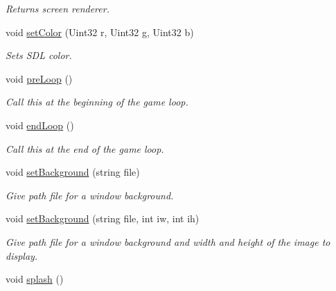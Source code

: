 \begin{DoxyCompactItemize}
\begin{DoxyCompactList}\small\item\em Returns screen renderer. \end{DoxyCompactList}\item 
void \hyperlink{classEngine_a64fd3142c61b0aa18c6f642a4dba9f1f}{set\+Color} (Uint32 r, Uint32 g, Uint32 b)\hypertarget{classEngine_a64fd3142c61b0aa18c6f642a4dba9f1f}{}\label{classEngine_a64fd3142c61b0aa18c6f642a4dba9f1f}

\begin{DoxyCompactList}\small\item\em Sets S\+DL color. \end{DoxyCompactList}\item 
void \hyperlink{classEngine_a0797e5b8fef41b25bc317fd4290b07a6}{pre\+Loop} ()\hypertarget{classEngine_a0797e5b8fef41b25bc317fd4290b07a6}{}\label{classEngine_a0797e5b8fef41b25bc317fd4290b07a6}

\begin{DoxyCompactList}\small\item\em Call this at the beginning of the game loop. \end{DoxyCompactList}\item 
void \hyperlink{classEngine_a998a6def6ff478e817c6633e8d1b56f3}{end\+Loop} ()\hypertarget{classEngine_a998a6def6ff478e817c6633e8d1b56f3}{}\label{classEngine_a998a6def6ff478e817c6633e8d1b56f3}

\begin{DoxyCompactList}\small\item\em Call this at the end of the game loop. \end{DoxyCompactList}\item 
void \hyperlink{classEngine_a671bd48802debd6c16638de60d32375d}{set\+Background} (string file)\hypertarget{classEngine_a671bd48802debd6c16638de60d32375d}{}\label{classEngine_a671bd48802debd6c16638de60d32375d}

\begin{DoxyCompactList}\small\item\em Give path file for a window background. \end{DoxyCompactList}\item 
void \hyperlink{classEngine_a3b29642732b85dc1b63e9a69efd97677}{set\+Background} (string file, int iw, int ih)\hypertarget{classEngine_a3b29642732b85dc1b63e9a69efd97677}{}\label{classEngine_a3b29642732b85dc1b63e9a69efd97677}

\begin{DoxyCompactList}\small\item\em Give path file for a window background and width and height of the image to display. \end{DoxyCompactList}\item 
void \hyperlink{classEngine_adb6f1426c5c57f9d60be1e10d8eb2506}{splash} ()\hypertarget{classEngine_adb6f1426c5c57f9d60be1e10d8eb2506}{}\label{classEngine_adb6f1426c5c57f9d60be1e10d8eb2506}


\end{DoxyCompactItemize}
